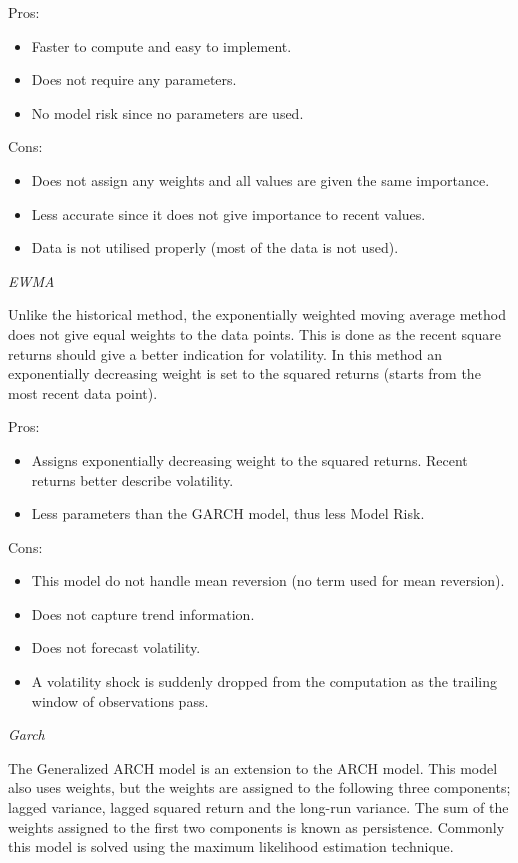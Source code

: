 Pros:
\begin{itemize}
    \item Faster to compute and easy to implement. 
    \item Does not require any parameters.
    \item No model risk since no parameters are used.
\end{itemize}

Cons:
\begin{itemize}
    \item Does not assign any weights and all values are given the same importance.
    \item Less accurate since it does not give importance to recent values. 
    \item Data is not utilised properly (most of the data is not used). 
\end{itemize}

\noindent
\textit{EWMA}

\noindent
Unlike the historical method, the exponentially weighted moving average method does not give equal weights to the data points.  This is done as the recent square returns should give a better indication for volatility. In this method an exponentially decreasing weight is set to the squared returns (starts from the most recent data point).

Pros:
\begin{itemize}
  \item Assigns exponentially decreasing weight to the squared returns. Recent returns better describe volatility. 
  \item Less parameters than the GARCH model, thus less Model Risk.
\end{itemize}

Cons:
\begin{itemize}
    \item This model do not handle mean reversion (no term used for mean reversion). 
    \item Does not capture trend information.
    \item Does not forecast volatility. 
    \item A volatility shock is suddenly dropped from the computation as the trailing window of observations pass. 
\end{itemize}

\noindent
\textit{Garch}

\noindent
The Generalized ARCH model is an extension to the ARCH model. This model also uses weights, but the weights are assigned to the following three components; lagged variance, lagged squared return and the long-run variance. The sum of the weights assigned to the first two components is known as persistence. Commonly this model is solved using the maximum likelihood estimation technique.

